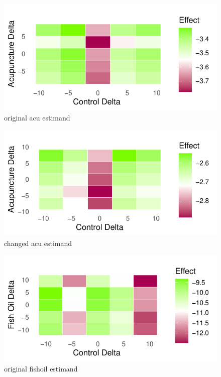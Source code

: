 \documentclass{article}
\newcommand{\pandocbounded}[1]{#1}
\begin{document}
\newpage

\begin{figure}
\centering
\pandocbounded{\includegraphics[keepaspectratio]{Final_Report_files/figure-latex/unnamed-chunk-35-1.pdf}}
\caption{original acu estimand}
\end{figure}

\begin{figure}
\centering
\pandocbounded{\includegraphics[keepaspectratio]{Final_Report_files/figure-latex/unnamed-chunk-36-1.pdf}}
\caption{changed acu estimand}
\end{figure}

\begin{figure}
\centering
\pandocbounded{\includegraphics[keepaspectratio]{Final_Report_files/figure-latex/unnamed-chunk-37-1.pdf}}
\caption{original fishoil estimand}
\end{figure}
\end{document}
